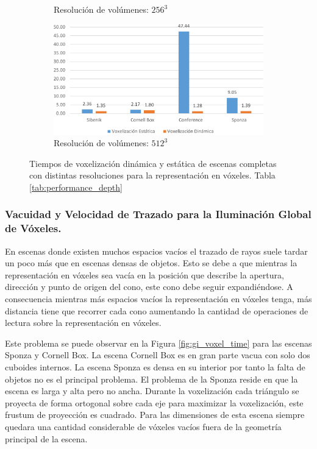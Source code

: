 \begin{figure}[H]
\begin{subfigure}{.49\textwidth}
		\caption*{Resolución de volúmenes: $256^3$}
	\end{subfigure}
	\begin{subfigure}{.49\textwidth}
		\centering
		\includegraphics[width=\linewidth]{media/voxelzation_512_cropped.pdf}	
		\caption*{Resolución de volúmenes: $512^3$}
	\end{subfigure}
	\caption{Tiempos de voxelización dinámica y estática de escenas completas con distintas resoluciones para la representación en vóxeles. Tabla \ref{tab:performance_depth}}
	\label{fig:voxelization_times}
\end{figure}

\subsubsection{Vacuidad y Velocidad de Trazado para la Iluminación Global de Vóxeles.}
\label{subsubsec:emptyness}

En escenas donde existen muchos espacios vacíos el trazado de rayos suele tardar un poco más que en escenas densas de objetos. Esto se debe a que mientras la representación en vóxeles sea vacía en la posición que describe la apertura, dirección y punto de origen del cono, este cono debe seguir expandiéndose. A consecuencia mientras más espacios vacíos la representación en vóxeles tenga, más distancia tiene que recorrer cada cono aumentando la cantidad de operaciones de lectura sobre la representación en vóxeles.

Este problema se puede observar en la Figura \ref{fig:gi_voxel_time} para las escenas Sponza y Cornell Box. La escena Cornell Box es en gran parte vacua con solo dos cuboides internos. La escena Sponza es densa en su interior por tanto la falta de objetos no es el principal problema. El problema de la Sponza reside en que la escena es larga y alta pero no ancha. Durante la voxelización cada triángulo se proyecta de forma ortogonal sobre cada eje para maximizar la voxelización, este frustum de proyección es cuadrado. Para las dimensiones de esta escena siempre quedara una cantidad considerable de vóxeles vacíos fuera de la geometría principal de la escena. 

